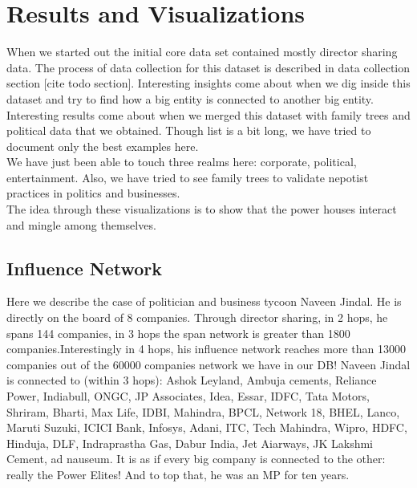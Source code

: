 \chapter{Results and Visualizations}

When we started out the initial core data set contained mostly director sharing data. The process of data collection for this dataset is described in data collection section [cite todo section]. Interesting insights come about when we dig inside this dataset and try to find how a big entity is connected to another big entity. \\

Interesting results come about when we merged this dataset with family trees and political data that we obtained. Though list is a bit long, we have tried to document only the best examples here. \\

We have just been able to touch three realms here: corporate, political, entertainment.
Also, we have tried to see family trees to validate nepotist practices in politics and businesses. \\

The idea through these visualizations is to show that the power houses interact and mingle among themselves. \\


\section{Influence Network}

Here we describe the case of politician and business tycoon Naveen Jindal. He is directly on the board of 8 companies. Through director sharing, in 2 hops, he spans 144 companies, in 3 hops the span network is greater than 1800 companies.Interestingly in 4 hops, his influence network reaches more than 13000 companies out of the 60000 companies network we have in our DB!  Naveen Jindal is connected to (within 3 hops): Ashok Leyland, Ambuja cements, Reliance Power, Indiabull, ONGC, JP Associates, Idea, Essar, IDFC, Tata Motors, Shriram, Bharti, Max Life, IDBI, Mahindra, BPCL, Network 18, BHEL, Lanco, Maruti Suzuki, ICICI Bank, Infosys, Adani, ITC, Tech Mahindra, Wipro, HDFC, Hinduja, DLF, Indraprastha Gas, Dabur India, Jet Aiarways, JK Lakshmi Cement, ad nauseum. It is as if every big company is connected to the other: really the Power Elites! And to top that, he was an MP for ten years.


